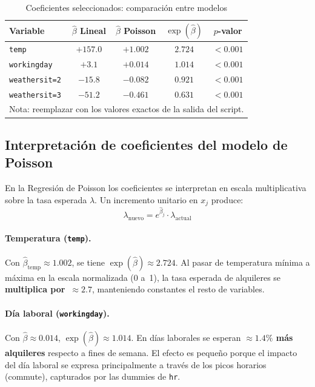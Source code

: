 \documentclass[12pt, a4paper]{article}
\begin{document}
	\begin{table}[H]
		\centering
		\caption{Coeficientes seleccionados: comparaci\'on entre modelos}
		\label{tab:coefs}
		\begin{tabular}{lcccc}
			\toprule
			\textbf{Variable} & \textbf{$\hat{\beta}$ Lineal} & \textbf{$\hat{\beta}$ Poisson}
			& \textbf{$\exp(\hat{\beta})$} & \textbf{$p$-valor} \\
			\midrule
			\texttt{temp}         & $+157.0$ & $+1.002$ & $2.724$ & $<0.001$ \\
			\texttt{workingday}   & $+3.1$   & $+0.014$ & $1.014$ & $<0.001$ \\
			\texttt{weathersit=2} & $-15.8$  & $-0.082$ & $0.921$ & $<0.001$ \\
			\texttt{weathersit=3} & $-51.2$  & $-0.461$ & $0.631$ & $<0.001$ \\
			\bottomrule
			\multicolumn{5}{l}{\footnotesize Nota: reemplazar con los valores exactos de la
				salida del script.}
		\end{tabular}
	\end{table}
	
	\subsection{Interpretaci\'on de coeficientes del modelo de Poisson}
	
	En la Regresi\'on de Poisson los coeficientes se interpretan en escala multiplicativa
	sobre la tasa esperada $\lambda$. Un incremento unitario en $x_j$ produce:
	\[
	\lambda_{\text{nuevo}} = e^{\hat{\beta}_j} \cdot \lambda_{\text{actual}}
	\]
	
	\paragraph{Temperatura (\texttt{temp}).}
	Con $\hat{\beta}_{\text{temp}} \approx 1.002$, se tiene
	$\exp(\hat{\beta}) \approx 2.724$. Al pasar de temperatura m\'inima a m\'axima en
	la escala normalizada (0 a~1), la tasa esperada de alquileres se
	\textbf{multiplica por~$\approx 2.7$}, manteniendo constantes el resto de variables.
	
	\paragraph{D\'ia laboral (\texttt{workingday}).}
	Con $\hat{\beta} \approx 0.014$, $\exp(\hat{\beta}) \approx 1.014$. En d\'ias
	laborales se esperan \textbf{$\approx 1.4\%$ m\'as alquileres} respecto a fines de
	semana. El efecto es peque\~no porque el impacto del d\'ia laboral se expresa
	principalmente a trav\'es de los picos horarios (commute), capturados por las
	dummies de \texttt{hr}.
	
\end{document}
